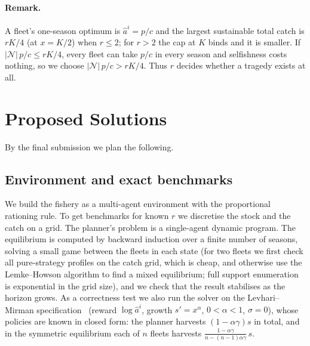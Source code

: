 \documentclass{article}
\begin{document}
\paragraph{Remark.} A fleet's one-season optimum is $\hat a^i=p/c$ and the largest sustainable total catch is $rK/4$ (at $x=K/2$) when $r\le 2$; for $r>2$ the cap at $K$ binds and it is smaller. If $|\mathcal N|\,p/c\le rK/4$, every fleet can take $p/c$ in every season and selfishness costs nothing, so we choose $|\mathcal N|\,p/c>rK/4$. Thus $r$ decides whether a tragedy exists at all.

\section{Proposed Solutions}
\label{sec:solutions}
By the final submission we plan the following.

\subsection{Environment and exact benchmarks}
We build the fishery as a multi-agent environment with the proportional rationing rule. To get benchmarks for known $r$ we discretise the stock and the catch on a grid. The planner's problem is a single-agent dynamic program. The equilibrium is computed by backward induction over a finite number of seasons, solving a small game between the fleets in each state (for two fleets we first check all pure-strategy profiles on the catch grid, which is cheap, and otherwise use the Lemke--Howson algorithm to find a mixed equilibrium; full support enumeration is exponential in the grid size), and we check that the result stabilises as the horizon grows. As a correctness test we also run the solver on the Levhari--Mirman specification~\cite{levhari1980} (reward $\log\hat a^i$, growth $s'=x^{\alpha}$, $0<\alpha<1$, $\sigma=0$), whose policies are known in closed form: the planner harvests $(1-\alpha\gamma)s$ in total, and in the symmetric equilibrium each of $n$ fleets harvests $\frac{1-\alpha\gamma}{n-(n-1)\alpha\gamma}\,s$.
\end{document}
